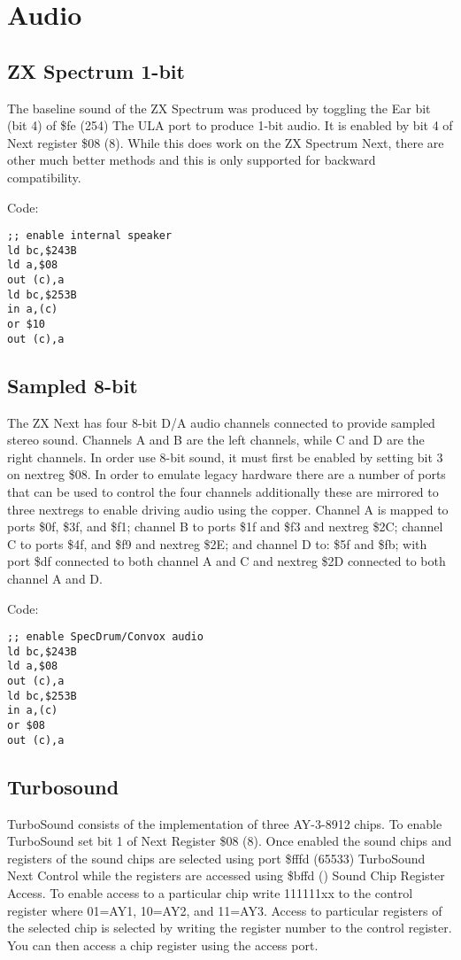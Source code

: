 \chapter{Audio}
\section{ZX Spectrum 1-bit}

The baseline sound of the ZX Spectrum was produced by toggling the Ear
bit (bit 4) of \$fe (254) The ULA port to produce 1-bit audio.  It is
enabled by bit 4 of Next register \$08 (8).  While this does work on
the ZX Spectrum Next, there are other much better methods and this is
only supported for backward compatibility.

Code:
\begin{verbatim}
;; enable internal speaker
ld bc,$243B
ld a,$08
out (c),a
ld bc,$253B
in a,(c)
or $10
out (c),a
\end{verbatim}

\section{Sampled 8-bit}

The ZX Next has four 8-bit D/A audio channels connected to provide
sampled stereo sound. Channels A and B are the left channels, while C
and D are the right channels. In order use 8-bit sound, it must first
be enabled by setting bit 3 on nextreg \$08. In order to emulate
legacy hardware there are a number of ports that can be used to
control the four channels additionally these are mirrored to three
nextregs to enable driving audio using the copper.  Channel A is
mapped to ports \$0f, \$3f, and \$f1; channel B to ports \$1f and \$f3
and nextreg \$2C; channel C to ports \$4f, and \$f9 and nextreg \$2E;
and channel D to: \$5f and \$fb; with port \$df connected to both
channel A and C and nextreg \$2D connected to both channel A and D.

Code:
\begin{verbatim}
;; enable SpecDrum/Convox audio
ld bc,$243B
ld a,$08
out (c),a
ld bc,$253B
in a,(c)
or $08
out (c),a
\end{verbatim}

\section{Turbosound}

TurboSound consists of the implementation of three AY-3-8912 chips. To
enable TurboSound set bit 1 of Next Register \$08 (8). Once enabled
the sound chips and registers of the sound chips are selected using
port \$fffd (65533) TurboSound Next Control while the registers are
accessed using \$bffd () Sound Chip Register Access.  To enable access
to a particular chip write 111111xx to the control register where
01=AY1, 10=AY2, and 11=AY3.  Access to particular registers of the
selected chip is selected by writing the register number to the
control register. You can then access a chip register using the access
port.

